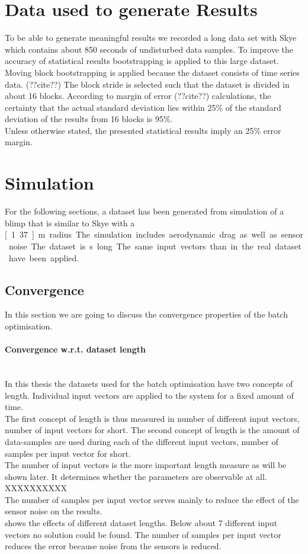 \section{Data used to generate Results}
\label{sec:bootstrapping_and_statistics}
To be able to generate meaningful results we recorded a long data set with Skye which contains about 850 seconds of undisturbed data samples.
To improve the accuracy of statistical results bootstrapping is applied to this large dataset.
Moving block bootstrapping is applied because the dataset consists of time series data. (??cite??)
The block stride is selected such that the dataset is divided in about 16 blocks.
According to margin of error (??cite??) calculations, the certainty that the actual standard deviation lies within 25\% of the standard deviation of the results from 16 blocks is 95\%. \\
Unless otherwise stated, the presented statistical results imply an 25\% error margin.

\section{Simulation}
For the following sections, a dataset has been generated from simulation of a blimp that is similar to Skye with a \unit[1.37]{m} radius.
The simulation includes aerodynamic drag as well as sensor noise.
The dataset is \unit[850]{s} long.
The same input vectors than in the real dataset have been applied.

\subsection{Convergence}
\label{sec:sim_convergence}
In this section we are going to discuss the convergence properties of the batch optimisation.

\paragraph{Convergence w.r.t. dataset length} ~\\
In this thesis the datasets used for the batch optimisation have two concepts of length.
Individual input vectors are applied to the system for a fixed amount of time. \\
The first concept of length is thus measured in number of different input vectors, number of input vectors for short.
The second concept of length is the amount of data-samples are used during each of the different input vectors, number of samples per input vector for short. \\
The number of input vectors is the more important length measure as will be shown later.
It determines whether the parameters are observable at all. XXXXXXXXXX\\
The number of samples per input vector serves mainly to reduce the effect of the sensor noise on the results. \\
 shows the effects of different dataset lengths.
Below about 7 different input vectors no solution could be found. 
The number of samples per input vector reduces the error because noise from the sensors is reduced.

